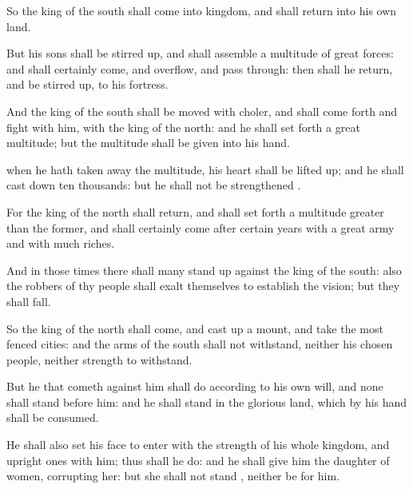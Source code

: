 {So the
king of the
south shall
come into
{}
kingdom, and shall
return into his own
land.

But his
sons shall be stirred
up, and shall
assemble a
multitude of
great
forces: and
{} shall
certainly
come, and
overflow, and pass
through: then shall he
return, and be stirred
up,
{} to his
fortress.

And the
king of the
south shall be moved with
choler, and shall come
forth and
fight with him,
{} with the
king of the
north: and he shall set
forth a
great
multitude; but the
multitude shall be
given into his
hand.

 when he hath taken
away the
multitude, his
heart shall be lifted
up; and he shall cast
down
{} ten
thousands: but he shall not be
strengthened
{}.

For the
king of the
north shall
return, and shall set
forth a
multitude
greater than the
former, and shall
certainly
come
after
certain
years with a
great
army and with
much
riches.

And in those
times there shall
many stand
up against the
king of the
south: also the
robbers of thy
people shall
exalt themselves to
establish the
vision; but they shall
fall.

So the
king of the
north shall
come, and cast
up a
mount, and
take the most
fenced
cities: and the
arms of the
south shall not
withstand, neither his
chosen
people, neither
{}
strength to
withstand.

But he that
cometh against him shall
do according to his own
will, and none shall
stand
before him: and he shall
stand in the
glorious
land, which by his
hand shall be
consumed.

He shall also
set his
face to
enter with the
strength of his whole
kingdom, and upright
ones with him; thus shall he
do: and he shall
give him the
daughter of
women,
corrupting her: but she shall not
stand
{}, neither be for him.

}
